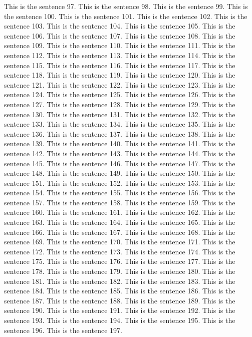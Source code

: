 \documentclass{article}
\begin{document}
This is the sentence 97.
This is the sentence 98.
This is the sentence 99.
This is the sentence 100.
This is the sentence 101.
This is the sentence 102.
This is the sentence 103.
This is the sentence 104.
This is the sentence 105.
This is the sentence 106.
This is the sentence 107.
This is the sentence 108.
This is the sentence 109.
This is the sentence 110.
This is the sentence 111.
This is the sentence 112.
This is the sentence 113.
This is the sentence 114.
This is the sentence 115.
This is the sentence 116.
This is the sentence 117.
This is the sentence 118.
This is the sentence 119.
This is the sentence 120.
This is the sentence 121.
This is the sentence 122.
This is the sentence 123.
This is the sentence 124.
This is the sentence 125.
This is the sentence 126.
This is the sentence 127.
This is the sentence 128.
This is the sentence 129.
This is the sentence 130.
This is the sentence 131.
This is the sentence 132.
This is the sentence 133.
This is the sentence 134.
This is the sentence 135.
This is the sentence 136.
This is the sentence 137.
This is the sentence 138.
This is the sentence 139.
This is the sentence 140.
This is the sentence 141.
This is the sentence 142.
This is the sentence 143.
This is the sentence 144.
This is the sentence 145.
This is the sentence 146.
This is the sentence 147.
This is the sentence 148.
This is the sentence 149.
This is the sentence 150.
This is the sentence 151.
This is the sentence 152.
This is the sentence 153.
This is the sentence 154.
This is the sentence 155.
This is the sentence 156.
This is the sentence 157.
This is the sentence 158.
This is the sentence 159.
This is the sentence 160.
This is the sentence 161.
This is the sentence 162.
This is the sentence 163.
This is the sentence 164.
This is the sentence 165.
This is the sentence 166.
This is the sentence 167.
This is the sentence 168.
This is the sentence 169.
This is the sentence 170.
This is the sentence 171.
This is the sentence 172.
This is the sentence 173.
This is the sentence 174.
This is the sentence 175.
This is the sentence 176.
This is the sentence 177.
This is the sentence 178.
This is the sentence 179.
This is the sentence 180.
This is the sentence 181.
This is the sentence 182.
This is the sentence 183.
This is the sentence 184.
This is the sentence 185.
This is the sentence 186.
This is the sentence 187.
This is the sentence 188.
This is the sentence 189.
This is the sentence 190.
This is the sentence 191.
This is the sentence 192.
This is the sentence 193.
This is the sentence 194.
This is the sentence 195.
This is the sentence 196.
This is the sentence 197.
\end{document}
